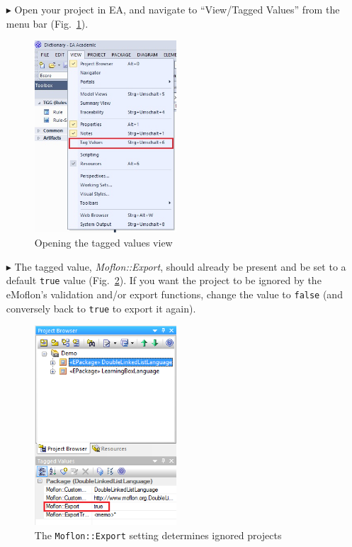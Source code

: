 \begin{enumerate}

\item[$\blacktriangleright$] Open your project in EA, and navigate to ``View/Tagged Values'' from the menu bar (Fig.~\ref{ea:view/Taggedvalues}).

\begin{figure}[htbp]
\begin{center}  \includegraphics[width=0.5\textwidth]{ea_viewTaggedValues}
  \caption{Opening the tagged values view}  
  \label{ea:view/Taggedvalues}
\end{center}
\end{figure} 

\item[$\blacktriangleright$] The tagged value, \emph{Moflon::Export}, should already be present and be set to a default \texttt{true} value
(Fig.~\ref{ea:moflonExportTG}). If you want the project to be ignored by the eMoflon's validation and/or export functions, change the value to
\texttt{false} (and conversely back to \texttt{true} to export it again).

\begin{figure}[htbp]
\begin{center}
\includegraphics[width=0.5\textwidth]{ea_moflonExportTG}
  \caption{The \texttt{Moflon::Export} setting determines ignored projects}  
  \label{ea:moflonExportTG}
\end{center}
\end{figure}

\end{enumerate}
